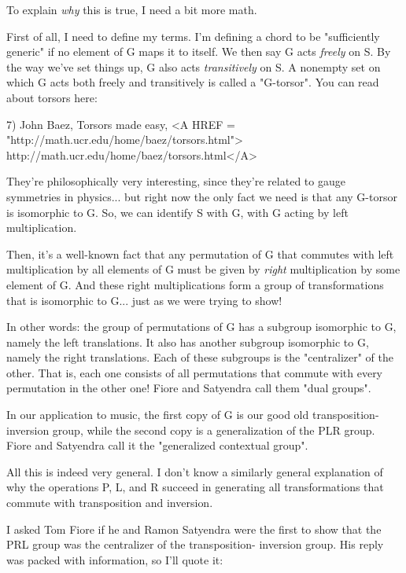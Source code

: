 To explain \emph{why} this is true, I need a bit more math.

First of all, I need to define my terms.  I'm defining a chord 
to be "sufficiently generic" if no element of G maps it to itself.  
We then say G acts \emph{freely} on S.  By the way we've set 
things up, G also acts \emph{transitively} on S.  A nonempty set on which G 
acts both freely and transitively is called a "G-torsor".  You can 
read about torsors here:

7) John Baez, Torsors made easy, 
<A HREF = "http://math.ucr.edu/home/baez/torsors.html">
http://math.ucr.edu/home/baez/torsors.html</A>

They're philosophically very interesting, since they're related
to gauge symmetries in physics... but right now the only fact we
need is that any G-torsor is isomorphic to G.  So, we can identify 
S with G, with G acting by left multiplication.  

Then, it's a well-known fact that any permutation of G that
commutes with left multiplication by all elements of G must be 
given by \emph{right} multiplication by some element of G.  And
these right multiplications form a group of transformations 
that is isomorphic to G... just as we were trying to show!

In other words: the group of permutations of G has a subgroup 
isomorphic to G, namely the left translations.  It also has
another subgroup isomorphic to G, namely the right translations.
Each of these subgroups is the "centralizer" of the other.  That
is, each one consists of all permutations that commute with every 
permutation in the other one!   Fiore and Satyendra call them 
"dual groups".  

In our application to music, the first copy of G is our good old 
transposition-inversion group, while the second copy is a 
generalization of the PLR group.  Fiore and Satyendra call it the 
"generalized contextual group".

All this is indeed very general.  I don't know a similarly 
general explanation of why the operations P, L, and R succeed 
in generating all transformations that commute with transposition 
and inversion.  

I asked Tom Fiore if he and Ramon Satyendra were the first to 
show that the PRL group was the centralizer of the transposition-
inversion group.  His reply was packed with information, so 
I'll quote it:

